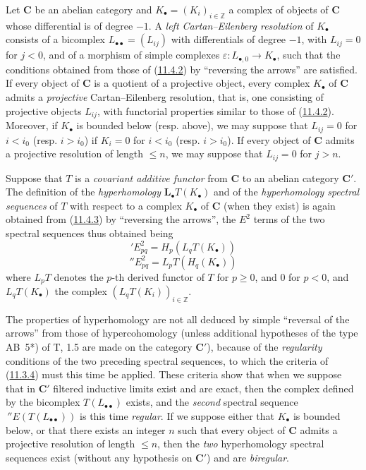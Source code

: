 \begin{env}[11.6.1]
\label{0.11.6.1}
Let $\boldsymbol{C}$ be an abelian category and
$K_\bullet=(K_i)_{i\in\mathbb Z}$ a complex of objects of $\boldsymbol{C}$ whose
differential is of degree $-1$. A \emph{left Cartan--Eilenberg
resolution} of $K_\bullet$ consists of a bicomplex
$L_{\bullet\bullet}=(L_{ij})$ with differentials of degree $-1$, with
$L_{ij}=0$ for $j<0$, and of a morphism of simple complexes
$\varepsilon:L_{\bullet,0}\to K_\bullet$, such that the conditions obtained
from those of (\hyperref[0.11.4.2]{11.4.2}) by ``reversing the
arrows'' are satisfied. If every object of $\boldsymbol{C}$ is a quotient of a
projective object, every complex $K_\bullet$ of $\boldsymbol{C}$ admits a
\emph{projective} Cartan--Eilenberg resolution, that is, one consisting of
projective objects $L_{ij}$, with functorial properties similar to those of
(\hyperref[0.11.4.2]{11.4.2}). Moreover, if $K_\bullet$ is bounded
below (resp. above), we may suppose that $L_{ij}=0$ for
$i<i_0$ (resp. $i>i_0$) if $K_i=0$ for $i<i_0$ (resp. $i>i_0$). If every
object of $\boldsymbol{C}$ admits a projective resolution of length $\leq n$,
we may suppose that $L_{ij}=0$ for $j>n$.
\end{env}

\begin{env}[11.6.2]
\label{0.11.6.2}
Suppose that $T$ is a \emph{covariant additive functor} from $\boldsymbol{C}$ to an
abelian category $\boldsymbol{C}'$. The definition of
the \emph{hyperhomology} $\mathbf{L}_\bullet T(K_\bullet)$ and of the \emph{hyperhomology
spectral sequences} of $T$ with respect to a complex $K_\bullet$ of
$\boldsymbol{C}$ (when they exist) is again obtained from
(\hyperref[0.11.4.3]{11.4.3}) by ``reversing the arrows'', the $E^2$
terms of the two spectral sequences thus obtained being
\[
\label{0.11.6.2.1}
\tag{11.6.2.1}
{}'E^2_{pq}=H_p(L_qT(K_\bullet))
\]
\[
\label{0.11.6.2.2}
\tag{11.6.2.2}
{}''E^2_{pq}=L_pT(H_q(K_\bullet))
\]
where $L_pT$ denotes the $p$-th derived functor of $T$ for $p\geq 0$, and $0$
for $p<0$, and $L_qT(K_\bullet)$ the complex
$(L_qT(K_i))_{i\in\mathbb Z}$.

The properties of hyperhomology are not all deduced by simple
``reversal of the arrows'' from those of hypercohomology (unless
additional hypotheses of the type AB~5*) of T, 1.5 are made on the
category $\boldsymbol{C}'$), because of the \emph{regularity} conditions of the two
preceding spectral sequences, to which the criteria of
(\hyperref[0.11.3.4]{11.3.4}) must this time be applied. These criteria show that
when we suppose that in $\boldsymbol{C}'$ filtered inductive limits
exist and are exact, then the complex defined by the bicomplex
$T(L_{\bullet\bullet})$ exists, and the \emph{second} spectral sequence
$\,{}''E(T(L_{\bullet\bullet}))$ is this time \emph{regular}. If we suppose
either that $K_\bullet$ is bounded below, or that there exists an integer
$n$ such that every object of $\boldsymbol{C}$ admits a projective resolution of
length $\leq n$, then the \emph{two} hyperhomology spectral sequences exist
(without any hypothesis on $\boldsymbol{C}'$) and are \emph{biregular}.
\end{env}

